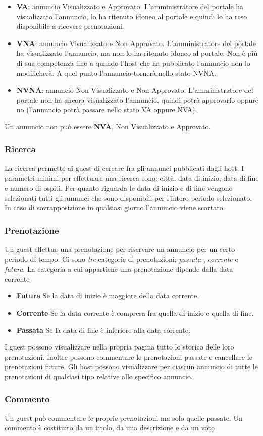 \documentclass[1_relazione.tex]{subfiles}
\begin{document}
\begin{itemize}
\item \textbf{VA}: annuncio Visualizzato e Approvato. L'amministratore del portale ha visualizzato l'annuncio, lo ha ritenuto idoneo al portale e quindi lo ha reso disponibile a ricevere prenotazioni.
\item \textbf{VNA}: annuncio Visualizzato e Non Approvato. L'amministratore del portale ha visualizzato l'annuncio, ma non lo ha ritenuto idoneo al portale. Non è più di sua competenza fino a quando l'host che ha pubblicato l'annuncio non lo modificherà. A quel punto l'annuncio tornerà nello stato NVNA.
\item \textbf{NVNA}: annuncio Non Visualizzato e Non Approvato. L'amministratore del portale non ha ancora visualizzato l'annuncio, quindi potrà approvarlo oppure no (l'annuncio potrà passare nello stato VA oppure NVA).
\end{itemize}
Un annuncio non può essere \textbf{NVA},  Non Visualizzato e Approvato. 

\subsubsection{Ricerca} 
La ricerca permette ai guest di cercare fra gli annunci pubblicati dagli host. I parametri minimi per effettuare una ricerca sono: città, data di inizio, data di fine e numero di ospiti. Per quanto riguarda le data di inizio e di fine vengono selezionati tutti gli annunci che sono disponibili per l'intero periodo selezionato. In caso di sovrapposizione in qualsiasi giorno l'annuncio viene scartato.

\subsubsection{Prenotazione} 
Un guest effettua una prenotazione per riservare un annuncio per un certo periodo di tempo. Ci sono \textit{tre} categorie di prenotazioni: \textit{passata} , \textit{corrente} e \textit{futura}.  La categoria a cui appartiene una prenotazione dipende dalla data corrente \\
\begin{itemize}
\item \textbf{Futura} Se la data di inizio è maggiore della data corrente.
\item \textbf{Corrente} Se la data corrente è compresa fra quella di inizio e quella di fine.
\item \textbf{Passata} Se la data di fine è inferiore alla data corrente.
\end{itemize}
I guest possono visualizzare nella propria pagina tutto lo storico delle loro prenotazioni. Inoltre possono commentare le prenotazioni passate e cancellare le prenotazioni future. 
Gli host possono visualizzare per ciascun annuncio di tutte le prenotazioni di qualsiasi tipo relative allo specifico annuncio.

\subsubsection{Commento} 
Un guest può commentare le proprie prenotazioni ma solo quelle passate. Un commento è costituito da un titolo, da una descrizione e da un voto 
\end{document}
